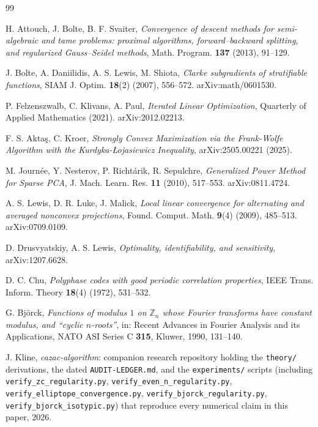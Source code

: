 \documentclass[11pt]{article}
\theoremstyle{plain}
\theoremstyle{definition}
\theoremstyle{remark}
\newcommand{\Z}{\mathbb Z}
\begin{document}
\begin{thebibliography}{99}

 H. Attouch, J. Bolte, B. F. Svaiter, \emph{Convergence of
descent methods for semi-algebraic and tame problems: proximal algorithms,
forward--backward splitting, and regularized Gauss--Seidel methods},
Math. Program. \textbf{137} (2013), 91--129.

 J. Bolte, A. Daniilidis, A. S. Lewis, M. Shiota,
\emph{Clarke subgradients of stratifiable functions}, SIAM J. Optim.
\textbf{18}(2) (2007), 556--572. arXiv:math/0601530.

 P. Felzenszwalb, C. Klivans, A. Paul, \emph{Iterated Linear
Optimization}, Quarterly of Applied Mathematics (2021). arXiv:2012.02213.

 F. S. Akta\c{s}, C. Kroer, \emph{Strongly Convex Maximization
via the Frank-Wolfe Algorithm with the Kurdyka-{\L}ojasiewicz Inequality},
arXiv:2505.00221 (2025).

 M. Journ\'ee, Y. Nesterov, P. Richt\'arik, R. Sepulchre,
\emph{Generalized Power Method for Sparse PCA}, J. Mach. Learn. Res.
\textbf{11} (2010), 517--553. arXiv:0811.4724.

 A. S. Lewis, D. R. Luke, J. Malick, \emph{Local linear
convergence for alternating and averaged nonconvex projections}, Found.
Comput. Math. \textbf{9}(4) (2009), 485--513. arXiv:0709.0109.

 D. Drusvyatskiy, A. S. Lewis, \emph{Optimality,
identifiability, and sensitivity}, arXiv:1207.6628.

 D. C. Chu, \emph{Polyphase codes with good periodic
correlation properties}, IEEE Trans. Inform. Theory \textbf{18}(4) (1972),
531--532.

 G. Bj\"orck, \emph{Functions of modulus $1$ on $\Z_n$
whose Fourier transforms have constant modulus, and ``cyclic $n$-roots''},
in: Recent Advances in Fourier Analysis and its Applications, NATO ASI
Series C \textbf{315}, Kluwer, 1990, 131--140.

 J. Kline, \emph{cazac-algorithm}: companion
research repository holding the {\tt theory/} derivations, the dated
{\tt AUDIT-LEDGER.md}, and the {\tt experiments/} scripts (including
{\tt verify\_zc\_regularity.py}, {\tt verify\_even\_n\_regularity.py},
{\tt verify\_elliptope\_convergence.py}, {\tt verify\_bjorck\_regularity.py},
{\tt verify\_bjorck\_isotypic.py}) that reproduce every numerical claim in
this paper, 2026.

\end{thebibliography}
\end{document}
